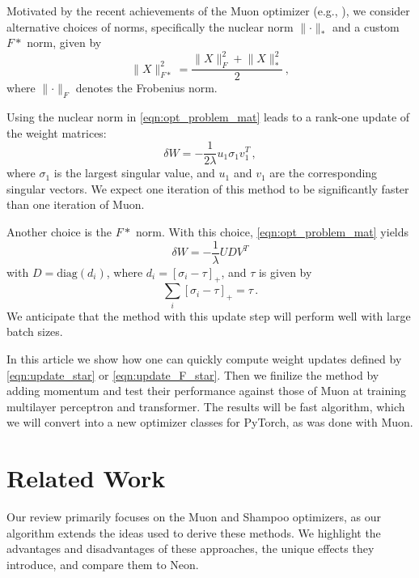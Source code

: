 \documentclass{article} %
\newcommand{\norm}[1]{\lVert #1\rVert}
\begin{document}
Motivated by the recent achievements of the Muon optimizer (e.g., \cite{liu2025muon}), we consider alternative choices of norms, specifically the nuclear norm $\norm{\cdot}_*$ and a custom $F*$ norm, given by 
\begin{equation}\label{eqn:F_star}
    \norm{X}_{F*}^2 = \frac{\norm{X}_F^2 + \norm{X}_*^2}{2}\,,
\end{equation}
where $\norm{\cdot}_F$ denotes the Frobenius norm.

Using the nuclear norm in \eqref{eqn:opt_problem_mat} leads to a rank-one update of the weight matrices:
\begin{equation}\label{eqn:update_star}
  \delta W = -\frac{1}{2\lambda} u_1 \sigma_1 v_1^T\,,
\end{equation}
where $\sigma_1$ is the largest singular value, and $u_1$ and $v_1$ are the corresponding singular vectors. We expect one iteration of this method to be significantly faster than one iteration of Muon.

Another choice is the $F*$ norm. With this choice, \eqref{eqn:opt_problem_mat} yields 
\begin{equation}\label{eqn:update_F_star}
\delta W = -\frac{1}{\lambda}UDV^T
\end{equation} 
with $D = \text{diag}(d_i)$, where $d_i = [\sigma_i - \tau]_+$, and $\tau$ is given by
\begin{equation}
    \sum_{i} [\sigma_i - \tau]_+ = \tau\,.
\end{equation}
We anticipate that the method with this update step will perform well with large batch sizes.

In this article we show how one can quickly compute weight updates defined by \eqref{eqn:update_star} or \eqref{eqn:update_F_star}. Then we finilize the method by adding momentum and test their performance against those of Muon at training multilayer perceptron and transformer. The results will be fast algorithm, which we will convert into a new optimizer classes for PyTorch, as was done with Muon.

\section{Related Work}
Our review primarily focuses on the Muon and Shampoo optimizers, as our algorithm extends the ideas used to derive these methods. We highlight the advantages and disadvantages of these approaches, the unique effects they introduce, and compare them to Neon.
\end{document}
